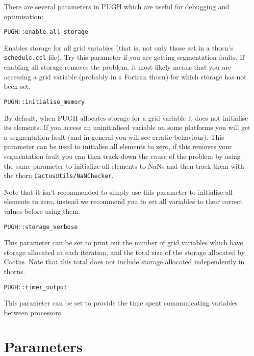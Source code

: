 \documentclass{article}
\begin{document}
There are several parameters in PUGH which are useful for debugging and
optimisation:

\begin{Lentry}

\item[{\tt PUGH::enable\_all\_storage}]

Enables storage for all grid variables (that is, not only
those set in a thorn's {\tt schedule.ccl} file). Try this parameter
if you are getting segmentation faults.  If enabling all storage
removes the problem, it most likely means that you are accessing
a grid variable (probably in a Fortran thorn) for which storage
has not been set.

\item[{\tt PUGH::initialise\_memory}]

By default, when PUGH allocates storage for a grid variable it
does not initialise its elements. If you access an
uninitialised variable on some platforms you will get a
segmentation fault (and in general you will see erratic
behaviour). This parameter can be used to initialise all
elements to zero, if this removes your segmentation fault you
can then track down the cause of the problem by using the same
parameter to initialize all elements to NaNs and then track
them with the thorn {\tt CactusUtils/NaNChecker}.

   Note that it isn't recommended to simply use this parameter to
initialise all elements to zero, instead we recommend you to
set all variables to their correct values before using them.

\item[{\tt PUGH::storage\_verbose}]

This parameter can be set to print out the number of grid variables
which have storage allocated at each iteration, and the total
size of the storage allocated by Cactus. Note that this total
does not include storage allocated independently in thorns.

\item[{\tt PUGH::timer\_output}]

This parameter can be set to provide the time spent communicating
variables between processors.

\end{Lentry}




\section{Parameters} 
\end{document}
